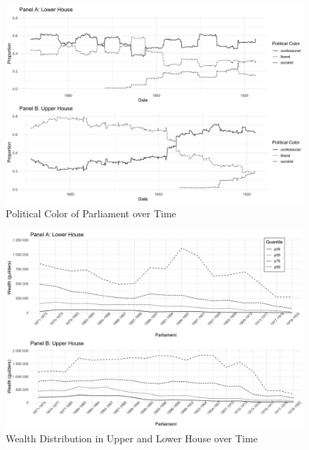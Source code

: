 \begin{landscape}

\begin{figure}
    \centering
    \includegraphics[scale=0.17]{figures/step4comp.png}
    \caption{Political Color of Parliament over Time}
    \label{fig:parltime}
\end{figure}

\end{landscape}
\clearpage

\begin{landscape}
\begin{figure}
    \centering
    \includegraphics[scale=0.17]{figures/step5fig2wealthperparl.png}
    \caption{Wealth Distribution in Upper and Lower House over Time}
    \label{fig:avgwealthtime}
\end{figure}
\end{landscape}
\clearpage

